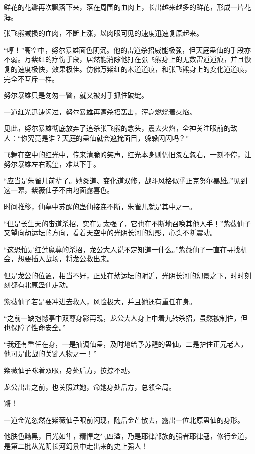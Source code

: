 \begin{this_body}
鲜花的花瓣再次飘落下来，落在周围的血肉上，长出越来越多的鲜花，形成一片花海。

张飞熊减损的血肉，不断上涨，以肉眼可见的速度迅速复原起来。

“哼！”高空中，努尔暴雄面色阴沉。他的雷道杀招威能极强，但天庭蛊仙的手段亦不弱。万紫红的疗伤手段，居然能消除他打在张飞熊身上的无数雷道道痕，并且恢复的速度极快，效果极佳。仿佛万紫红的木道道痕，和张飞熊身上的变化道道痕，完全不互斥一样。

努尔暴雄只是匆匆一瞥，就又被对手抓住破绽。

一道红光迅速闪过，努尔暴雄再遭杀招轰击，浑身燃烧着火焰。

见此，努尔暴雄彻底放弃了追杀张飞熊的念头，震去火焰，全神关注眼前的敌人：“你究竟是谁？天庭的蛊仙就会遮掩面目，躲躲闪闪吗？”

飞舞在空中的红光中，传来清脆的笑声，红光本身则仍旧忽左忽右，一刻不停，让努尔暴雄左右观望，难以下手。

“应当是朱雀儿前辈了。她炎道、变化道双修，战斗风格似乎正克努尔暴雄。”见到这一幕，紫薇仙子不由地面露喜色。

时间推移，仙墓中苏醒的蛊仙接连不断，朱雀儿就是其中之一。

“但是长生天的宙道杀招，实在是太强了，它也在不断地召唤其他人手！”紫薇仙子又望向劫运坛的方向，看着天空中的光阴长河的幻影，心头不断震动。

“这恐怕是红莲魔尊的杀招，龙公大人说不定知道一什么。”紫薇仙子一直在寻找机会，想要插入战场，将龙公救出来。

但是龙公的位置，相当不好，正处在劫运坛的附近，光阴长河的幻景之下，时时刻刻都有北原蛊仙走动。

紫薇仙子若是要冲进去救人，风险极大，并且她还有重任在身。

“之前一缺抱憾亭中双尊身影再现，龙公大人身上中着九转杀招，虽然被制住，但也保障了性命安全。”

“我还有重任在身，一是抽调仙蛊，及时地给予苏醒的蛊仙，二是护住正元老人，他可是此战的关键人物之一！”

紫薇仙子眯着双眼，身处后方，按捺不动。

龙公出击之前，也关照过她，命她身处后方，总领全局。

锵！

一道金光忽然在紫薇仙子眼前闪现，随后金芒散去，露出一位北原蛊仙的身形。

他肤色黝黑，目光如隼，精悍之气四溢，乃是耶律部族的强者耶律寇，修行金道，是第二批从光阴长河幻景中走出来的史上强人！


\end{this_body}
